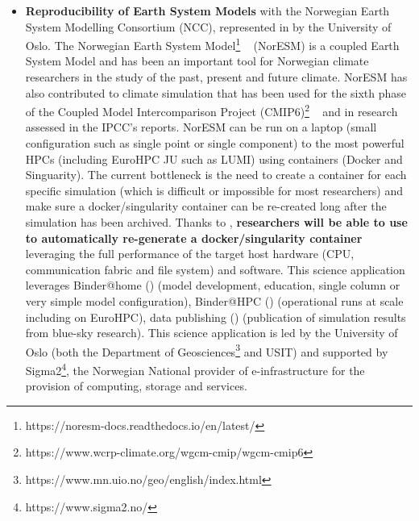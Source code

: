 \begin{itemize}
  to increase the reuse of enormous amounts of data that will be made available to everyone through FAIR@UiO platform.
  FAIR@UiO is led by the University's Center for Information Technology of the University of Oslo
  (USIT\footnote{https://www.usit.uio.no/}).
\item \textbf{Reproducibility of Earth System Models} with the Norwegian Earth System Modelling Consortium (NCC),
   represented in \TheProject by the University of Oslo. The Norwegian Earth System Model\footnote{https://noresm-docs.readthedocs.io/en/latest/}
  ~\cite{Seland2020} (NorESM) is a coupled Earth System Model and has been an important tool for Norwegian
  climate researchers in the study of the past, present and future climate. NorESM has also contributed
   to climate simulation that has been used for the sixth phase of the Coupled Model Intercomparison Project (CMIP6)\footnote{https://www.wcrp-climate.org/wgcm-cmip/wgcm-cmip6}
   ~\cite{Seland2020} and in research assessed in the IPCC’s reports.
   NorESM can be run on a laptop (small configuration such as single
  point or single component) to the most powerful HPCs (including EuroHPC JU such as LUMI) using containers (Docker and Singuarity).
  The current bottleneck is the need to create a container for each specific
  simulation (which is difficult or impossible for most researchers) and
  make sure a docker/singularity container can be re-created long after the simulation has been archived.
  Thanks to \TheProject, \textbf{researchers will be able to use \repotodocker{} to automatically re-generate a docker/singularity container} leveraging the full performance of the target host hardware (CPU, communication fabric and file system) and software.
  This science application leverages Binder@home () (model
development, education, single column or very simple model configuration), Binder@HPC () (operational runs at scale including on EuroHPC),
data publishing  () (publication of simulation results from
blue-sky research). This science application is led by the University of Oslo (both the Department of Geosciences\footnote{https://www.mn.uio.no/geo/english/index.html} and USIT)
and supported by Sigma2\footnote{https://www.sigma2.no/}, the Norwegian National
provider of e-infrastructure for the provision of computing, storage and
services.

\end{itemize}

